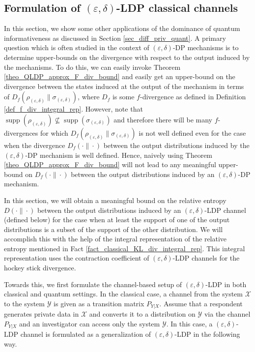 \documentclass[onecolumn,ldraftcls, 11pt]{IEEEtran}
\newcommand{\supp}{\operatorname{supp}}
\newcommand{\eps}{\varepsilon}
\newcommand*{\cX}{\mathcal{X}}
\newcommand*{\cY}{\mathcal{Y}}
\begin{document}
\subsection{Formulation of 
$(\eps,\delta)$-LDP classical channels}
In this section, we show some other applications of the dominance of quantum informativeness as discussed in Section \ref{sec_diff_priv_quant}. A primary question which is often studied in the context of $(\eps,\delta)$-DP mechanisms is to determine upper-bounds on the divergence with respect to the output induced by the mechanisms. To do this, we can easily invoke Theorem \ref{theo_QLDP_approx_F_div_bound} and easily get an upper-bound on the divergence between the states induced at the output of the mechanism in terms of $D_f(\rho_{(\eps,\delta)}\|\sigma_{(\eps,\delta)})$, where $D_f$ is some $f$-divergence as defined in Definition \ref{def_f_div_integral_rep}. However, note that $\supp(\rho_{(\eps,\delta)}) \nsubseteq \supp(\sigma_{(\eps,\delta)})$ and therefore there will be many $f$-divergences for which $D_f(\rho_{(\eps,\delta)}\| \sigma_{(\eps,\delta)})$ is not well defined even for the case when the divergence $D_f(\cdot\|\cdot)$ between the output distributions induced by the $(\eps,\delta)$-DP mechanism is well defined. Hence, naively using Theorem \ref{theo_QLDP_approx_F_div_bound} will not lead to any meaningful upper-bound on $D_f(\cdot\|\cdot)$ between the output distributions induced by an $(\eps,\delta)$-DP mechanism. 

In this section, we will obtain a meaningful bound on the relative entropy $D(\cdot\|\cdot)$ between the output distributions induced by an $(\eps,\delta)$-LDP channel (defined below) for the case when at least the support of one of the output distributions is a subset of the support of the other distribution. We will accomplish this with the help of the integral representation of the relative entropy mentioned in Fact \ref{fact_classical_KL_div_integral_rep}. This integral representation uses the contraction coefficient of $(\eps,\delta)$-LDP channels for the hockey stick divergence. 

Towards this, we first formulate the channel-based setup of $(\eps,\delta)$-LDP in both classical and quantum settings. 
In the classical case, a channel from the system $\cX$ to the system $\cY$
is given as a transition matrix $P_{Y|X}$.
Assume that a respondent generates private data in $\cX$ and converts it to 
a distribution on $\cY$ via the channel $P_{Y|X}$
and an investigator can access only the system $\cY$.
In this case,
a $(\eps,\delta)$-LDP channel is formulated 
as a generalization of $(\eps,\delta)$-LDP in the following way.
\end{document}
